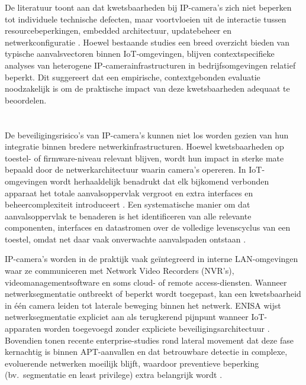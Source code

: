 De literatuur toont aan dat kwetsbaarheden bij IP-camera’s zich niet beperken tot individuele technische defecten, maar voortvloeien uit de interactie tussen resourcebeperkingen, embedded architectuur, updatebeheer en netwerkconfiguratie \autocite{Butun2019arXivIoTSecurity,zhou2023survey}. Hoewel bestaande studies een breed overzicht bieden van typische aanvalsvectoren binnen IoT-omgevingen, blijven contextspecifieke analyses van heterogene IP-camerainfrastructuren in bedrijfsomgevingen relatief beperkt. Dit suggereert dat een empirische, contextgebonden evaluatie noodzakelijk is om de praktische impact van deze kwetsbaarheden adequaat te beoordelen.

\section{}%
\label{sec:netwerkintegratie-attack-surface}

De beveiligingsrisico’s van IP-camera’s kunnen niet los worden gezien van hun integratie binnen bredere netwerkinfrastructuren. Hoewel kwetsbaarheden op toestel- of firmware-niveau relevant blijven, wordt hun impact in sterke mate bepaald door de netwerkarchitectuur waarin camera’s opereren. In IoT-omgevingen wordt herhaaldelijk benadrukt dat elk bijkomend verbonden apparaat het totale aanvalsoppervlak vergroot en extra interfaces en beheercomplexiteit introduceert \autocite{Butun2019arXivIoTSecurity}. Een systematische manier om dat aanvalsoppervlak te benaderen is het identificeren van alle relevante componenten, interfaces en datastromen over de volledige levenscyclus van een toestel, omdat net daar vaak onverwachte aanvalspaden ontstaan \autocite{Liebl2024arXivIIoTAttackSurface}.

IP-camera’s worden in de praktijk vaak geïntegreerd in interne LAN-omgevingen waar ze communiceren met Network Video Recorders (NVR’s), videomanagementsoftware en soms cloud- of remote access-diensten. Wanneer netwerksegmentatie ontbreekt of beperkt wordt toegepast, kan een kwetsbaarheid in één camera leiden tot laterale beweging binnen het netwerk. ENISA wijst netwerksegmentatie expliciet aan als terugkerend pijnpunt wanneer IoT-apparaten worden toegevoegd zonder expliciete beveiligingsarchitectuur \autocite{ENISA2024ThreatLandscape}. Bovendien tonen recente enterprise-studies rond lateral movement dat deze fase kernachtig is binnen APT-aanvallen en dat betrouwbare detectie in complexe, evoluerende netwerken moeilijk blijft, waardoor preventieve beperking (bv.\ segmentatie en least privilege) extra belangrijk wordt \autocite{khoury2024jbeil}.

